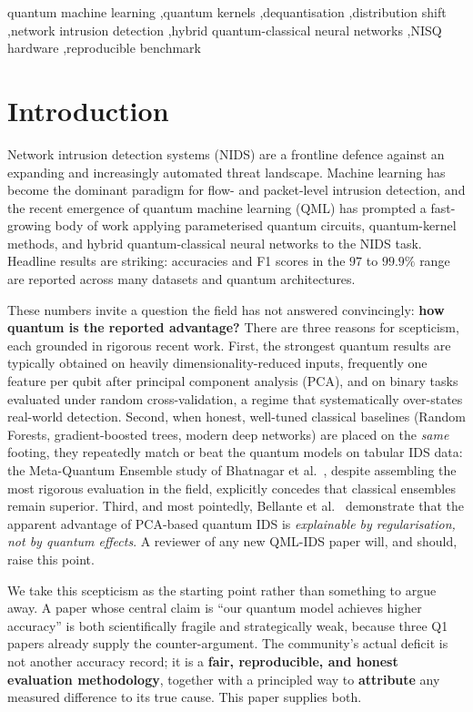 \documentclass[preprint,11pt]{elsarticle}
\begin{document}
\begin{frontmatter}
\begin{keyword}
quantum machine learning \sep quantum kernels \sep dequantisation \sep distribution shift
\sep network intrusion detection \sep hybrid quantum-classical neural networks \sep NISQ hardware
\sep reproducible benchmark
\end{keyword}

\end{frontmatter}

\section{Introduction}
Network intrusion detection systems (NIDS) are a frontline defence against an expanding
and increasingly automated threat landscape. Machine learning has become the dominant
paradigm for flow- and packet-level intrusion detection, and the recent emergence of
quantum machine learning (QML) has prompted a fast-growing body of work applying
parameterised quantum circuits, quantum-kernel methods, and hybrid quantum-classical
neural networks to the NIDS task. Headline results are striking: accuracies and F1 scores
in the $97$ to $99.9\%$ range are reported across many datasets and quantum architectures.

These numbers invite a question the field has not answered convincingly: \textbf{how
quantum is the reported advantage?} There are three reasons for scepticism, each grounded
in rigorous recent work. First, the strongest quantum results are typically obtained on
heavily dimensionality-reduced inputs, frequently one feature per qubit after principal
component analysis (PCA), and on binary tasks evaluated under random cross-validation, a
regime that systematically over-states real-world detection. Second, when honest, well-tuned
classical baselines (Random Forests, gradient-boosted trees, modern deep networks) are placed
on the \emph{same} footing, they repeatedly match or beat the quantum models on tabular IDS
data: the Meta-Quantum Ensemble study of Bhatnagar et al.~\cite{bhatnagar2026mqe}, despite
assembling the most rigorous evaluation in the field, explicitly concedes that classical
ensembles remain superior. Third, and most pointedly, Bellante
et al.~\cite{bellante2025pca} demonstrate that the apparent advantage of
PCA-based quantum IDS is \emph{explainable by regularisation, not by quantum effects}. A
reviewer of any new QML-IDS paper will, and should, raise this point.

We take this scepticism as the starting point rather than something to argue away. A paper
whose central claim is ``our quantum model achieves higher accuracy'' is both scientifically
fragile and strategically weak, because three Q1 papers already supply the counter-argument.
The community's actual deficit is not another accuracy record; it is a \textbf{fair,
reproducible, and honest evaluation methodology}, together with a principled way to
\textbf{attribute} any measured difference to its true cause. This paper supplies both.
\end{document}
